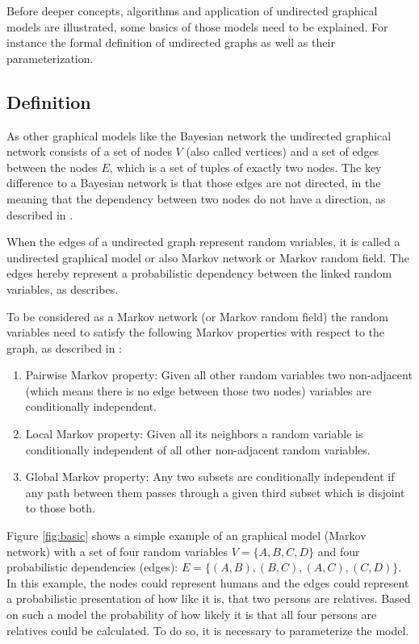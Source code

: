Before deeper concepts, algorithms and application of undirected graphical models are illustrated, some basics of those models need to be explained. For instance the formal definition of undirected graphs as well as their parameterization.

\subsection{Definition}

As other graphical models like the Bayesian network the undirected graphical network consists of a set of nodes $V$ (also called vertices) and a set of edges between the nodes $E$, which is a set of tuples of exactly two nodes. The key difference to a Bayesian network is that those edges are not directed, in the meaning that the dependency between two nodes do not have a direction, as described in \cite{koller2009probabilistic}.

When the edges of a undirected graph represent random variables, it is called a undirected graphical model or also Markov network or Markov random field. The edges hereby represent a probabilistic dependency between the linked random variables, as \cite{kindermann1980markov} describes.

To be considered as a Markov network (or Markov random field) the random variables need to satisfy the following Markov properties with respect to the graph, as described in \cite{markov1957theory}:

\begin{enumerate}
\item Pairwise Markov property: Given all other random variables two non-adjacent (which means there is no edge between those two nodes) variables are conditionally independent.
\item Local Markov property: Given all its neighbors a random variable is conditionally independent of all other non-adjacent random variables.
\item Global Markov property: Any two subsets are conditionally independent if any path between them passes through a given third subset which is disjoint to those both.  
\end{enumerate}


Figure \ref{fig:basic} shows a simple example of an graphical model (Markov network) with a set of four random variables $V=\{A,B,C,D\}$ and four probabilistic dependencies (edges): $E=\{(A,B),(B,C),(A,C),(C,D)\}$. In this example, the nodes could represent humans and the edges could represent a probabilistic presentation of how like it is, that two persons are relatives. Based on such a model the probability of how likely it is that all four persons are relatives could be calculated. To do so, it is necessary to parameterize the model.

